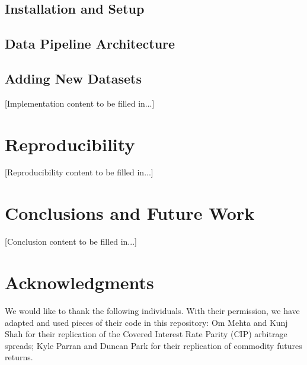 \documentclass{article}
\begin{document}
\subsection{Installation and Setup}

\subsection{Data Pipeline Architecture}

\subsection{Adding New Datasets}

[Implementation content to be filled in...]

\section{Reproducibility}
\label{sec:reproducibility}


[Reproducibility content to be filled in...]

\section{Conclusions and Future Work}
\label{sec:conclusion}


[Conclusion content to be filled in...]

\section*{Acknowledgments}

We would like to thank the following individuals. With their permission, we have adapted and used pieces of their code in this repository: Om Mehta and Kunj Shah for their replication of the Covered Interest Rate Parity (CIP) arbitrage spreads; Kyle Parran and Duncan Park for their replication of commodity futures returns.
\end{document}
